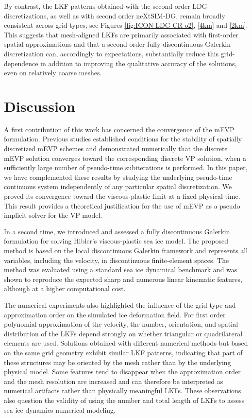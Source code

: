 \documentclass[11pt]{article}
\begin{document}
By contrast, the LKF patterns obtained with the second-order LDG discretizations, as well as with second order neXtSIM-DG, remain broadly consistent across grid types; see Figures \ref{fig:ICON LDG CR o2}, \ref{4km} and \ref{2km}. This suggests that mesh-aligned LKFs are primarily associated with first-order spatial approximations and that a second-order fully discontinuous Galerkin discretization can, accordingly to expectations, substantially reduce this grid-dependence in addition to improving the qualitative accuracy of the solutions, even on relatively coarse meshes.



\section{Discussion}
A first contribution of this work has concerned the convergence of the mEVP formulation. Previous studies established conditions for the stability of spatially discretized mEVP schemes and demonstrated numerically that the discrete mEVP solution converges toward the corresponding discrete VP solution, when a sufficiently large number of pseudo-time subiterations is performed. In this paper, we have complemented these results by studying the underlying pseudo-time continuous system independently of any particular spatial discretization. We proved its convergence toward the viscous-plastic limit at a fixed physical time. This result provides a theoretical justification for the use of mEVP as a pseudo implicit solver for the VP model.

In a second time, we introduced and assessed a fully discontinuous Galerkin formulation for solving Hibler's viscous-plastic sea ice model. The proposed method is based on the local discontinuous Galerkin framework and represents all variables, including the velocity, in discontinuous finite-element spaces. The method was evaluated using a standard sea ice dynamical benchmark and was shown to reproduce the expected sharp and numerous linear kinematic features, although at a higher computational cost.

The numerical experiments also highlighted the influence of the grid type and approximation order on the simulated ice deformation field. For first order polynomial approximation of the velocity, the number, orientation, and spatial distribution of the LKFs depend strongly on whether triangular or quadrilateral elements are used. Solutions obtained with different numerical methods but based on the same grid geometry exhibit similar LKF patterns, indicating that part of these structures may be oriented by the mesh rather than by the underlying physical model. Some features tend to disappear when the approximation order and the mesh resolution are increased and can therefore be interpreted as numerical artifacts rather than physically meaningful LKFs. These observations also question the validity of using the number and total length of LKFs to assess sea ice dynamics numerical modeling.
\end{document}
